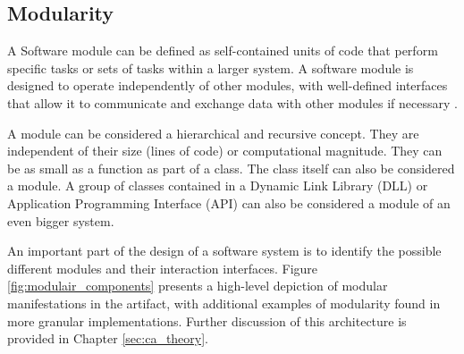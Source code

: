 \subsection{Modularity}

A Software module can be defined as self-contained units of code that perform specific
tasks or sets of tasks within a larger system. A software module is designed to operate
independently of other modules, with well-defined interfaces that allow it to communicate
and exchange data with other modules if necessary \autocite[22]{mannaert_normalized_2016}.

A module can be considered a hierarchical and recursive concept. They are independent of
their size (lines of code) or computational magnitude. They can be as small as a function
as part of a class. The class itself can also be considered a module. A group of classes
contained in a Dynamic Link Library (DLL) or Application Programming Interface (API) can
also be considered a module of an even bigger system. 

An important part of the design of a software system is to identify the possible different
modules and their interaction interfaces. Figure \ref{fig:modulair_components} presents a
high-level depiction of modular manifestations in the artifact, with additional examples
of modularity found in more granular implementations. Further discussion of this
architecture is provided in Chapter \ref{sec:ca_theory}.